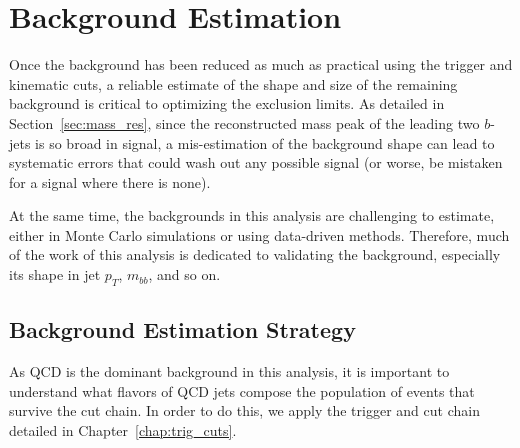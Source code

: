  

\chapter[Background Estimation]{Background Estimation}

Once the background has been reduced as much as practical using the trigger and kinematic cuts,
a reliable estimate of the shape and size of the remaining background is critical to optimizing
the exclusion limits.  As detailed in Section~\ref{sec:mass_res}, since the reconstructed mass peak 
of the leading two $b$-jets is so
broad in signal, a mis-estimation of the background shape can lead to systematic errors that
could wash out any possible signal (or worse, be mistaken for a signal where there is none).  

At the same time, the backgrounds in this analysis are challenging to estimate, either in Monte
Carlo simulations or using data-driven methods.  Therefore, much of the work of this analysis is dedicated
to validating the background, especially its shape in jet $p_T$, $m_{bb}$, and so on.



\section{Background Estimation Strategy}
\label{sec:background_strategy}
As QCD is the dominant background in this analysis, it is important to understand
what flavors of QCD jets compose the population of events that survive the cut
chain.  In order to do this, we apply the trigger and cut chain detailed in Chapter~\ref{chap:trig_cuts}.

